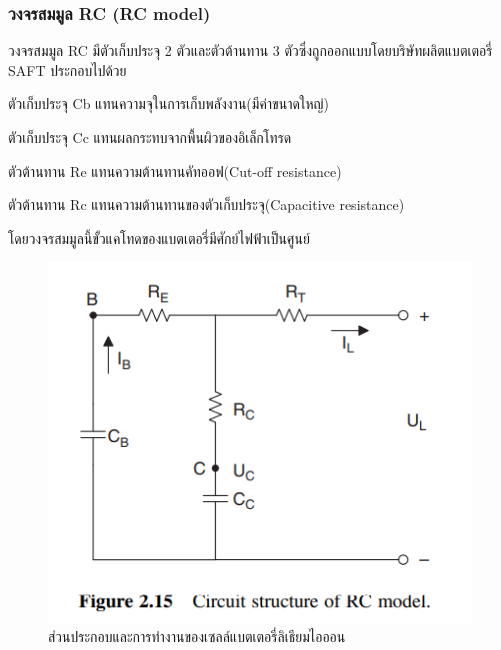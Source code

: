 \subsubsection*{วงจรสมมูล RC (RC model)}
วงจรสมมูล RC มีตัวเก็บประจุ 2 ตัวและตัวต้านทาน 3 ตัวซึ่งถูกออกแบบโดยบริษัทผลิตแบตเตอรี่ SAFT ประกอบไปด้วย
\begin{itemize}
	{\item 	ตัวเก็บประจุ Cb แทนความจุในการเก็บพลังงาน(มีค่าขนาดใหญ่)}
	{\item 	ตัวเก็บประจุ Cc แทนผลกระทบจากพื้นผิวของอิเล็กโทรด}
	{\item 	ตัวต้านทาน Re แทนความต้านทานคัทออฟ(Cut-off resistance)}
	{\item 	ตัวต้านทาน Rc แทนความต้านทานของตัวเก็บประจุ(Capacitive resistance)}
\end{itemize}
โดยวงจรสมมูลนี้ขั้วแคโทดของแบตเตอรี่มีศักย์ไฟฟ้าเป็นศูนย์\newline
\begin{center}
	\begin{figure}[!h]
		\includegraphics[width=0.6\linewidth]{Chapters/img/RC_model.png}
			\centering
			\captionsetup{justification=centering,margin=2cm}
			\caption{ส่วนประกอบและการทำงานของเซลล์แบตเตอรี่ลิเธียมไอออน}
	\end{figure}
\end{center}
